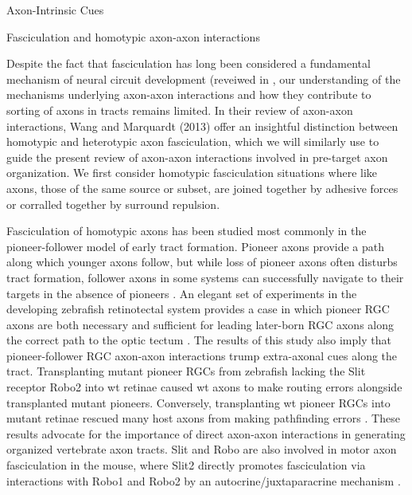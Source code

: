 Axon-Intrinsic Cues

Fasciculation and homotypic axon-axon interactions

Despite the fact that fasciculation has long been considered a fundamental mechanism of neural circuit development (reveiwed in \cite{raper2010cellular,wang2013axons}, our understanding of the mechanisms underlying axon-axon interactions and how they contribute to sorting of axons in tracts remains limited.
In their review of axon-axon interactions, Wang and Marquardt (2013) offer an insightful distinction between homotypic and heterotypic axon fasciculation, which we will similarly use to guide the present review of axon-axon interactions involved in pre-target axon organization. 
We first consider homotypic fasciculation situations where like axons, those of the same source or subset, are joined together by adhesive forces or corralled together by surround repulsion.

Fasciculation of homotypic axons has been studied most commonly in the pioneer-follower model of early tract formation. 
Pioneer axons provide a path along which younger axons follow, but while loss of pioneer axons often disturbs tract formation, follower axons in some systems can successfully navigate to their targets in the absence of pioneers \cite{raper2010cellular}.
An elegant set of experiments in the developing zebrafish retinotectal system provides a case in which pioneer RGC axons are both necessary and sufficient for leading later-born RGC axons along the correct path to the optic tectum \cite{pittman2008pathfinding}.
The results of this study also imply that pioneer-follower RGC axon-axon interactions trump extra-axonal cues along the tract.
Transplanting mutant pioneer RGCs from zebrafish lacking the Slit receptor Robo2 into wt retinae caused wt axons to make routing errors alongside transplanted mutant pioneers.
Conversely, transplanting wt pioneer RGCs into mutant retinae rescued many host axons from making pathfinding errors \cite{pittman2008pathfinding}.
These results advocate for the importance of direct axon-axon interactions in generating organized vertebrate axon tracts.
Slit and Robo are also involved in motor axon fasciculation in the mouse, where Slit2 directly promotes fasciculation via interactions with Robo1 and Robo2 by an autocrine/juxtaparacrine mechanism \cite{jaworski2012autocrine}.

